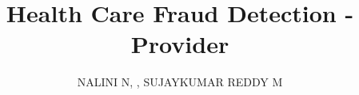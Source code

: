 \documentclass{ieeeaccess}
\begin{document}
	
	

\title{Health Care Fraud Detection - Provider}
\author{\uppercase{Nalini N}, ,
\uppercase{SujayKumar Reddy M}
}

\address[1]{Department of Computer Science and Engineering, Vellore Institute of Technology, Vellore (e-mail: nalini@vit.ac.in)}
\address[2]{Vellore Institute of Technology, Vellore (e-mail: sujaykumarreddy.m2020@vitstudent.ac.in)}







\begin{abstract}






\end{abstract}
\end{document}
